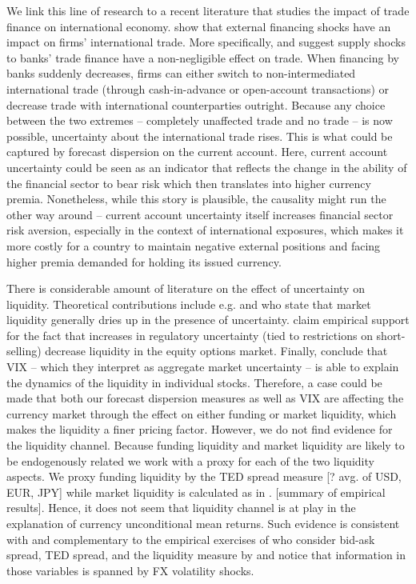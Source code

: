 We link this line of research to a recent literature that studies the impact of trade finance on international economy. \citet{chor_manova2012} show that external financing shocks have an impact on firms' international trade. More specifically, \citet{amiti_weinstein2011} and \citet{niepmann_schmidt2014b} suggest supply shocks to banks' trade finance have a non-negligible effect on trade. When financing by banks suddenly decreases, firms can either switch to non-intermediated international trade (through cash-in-advance or open-account transactions) or decrease trade with international counterparties outright. Because any choice between the two extremes -- completely unaffected trade and no trade -- is now possible, uncertainty about the international trade rises. This is what could be captured by forecast dispersion on the current account. Here, current account uncertainty could be seen as an indicator that reflects the change in the ability of the financial sector to bear risk which then translates into higher currency premia. Nonetheless, while this story is plausible, the causality might run the other way around -- current account uncertainty itself increases financial sector risk aversion, especially in the context of international exposures, which makes it more costly for a country to maintain negative external positions and facing higher premia demanded for holding its issued currency.

There is considerable amount of literature on the effect of uncertainty on liquidity. Theoretical contributions include e.g. \citet{routledge_zin2009} and \citet{easley_ohara2010} who state that market liquidity generally dries up in the presence of uncertainty. \citet{battalio_schultz2011} claim empirical support for the fact that increases in regulatory uncertainty (tied to restrictions on short-selling) decrease liquidity in the equity options market. Finally, \citet{chung_chuwonganant2014} conclude that VIX -- which they interpret as aggregate market uncertainty -- is able to explain the dynamics of the liquidity in individual stocks. Therefore, a case could be made that both our forecast dispersion measures as well as VIX are affecting the currency market through the effect on either funding or market liquidity, which makes the liquidity a finer pricing factor. However, we do not find evidence for the liquidity channel. Because funding liquidity and market liquidity are likely to be endogenously related \citep{brunnermeier_pedersen2009} we work with a proxy for each of the two liquidity aspects. We proxy funding liquidity by the TED spread measure [? avg. of USD, EUR, JPY] while market liquidity is calculated as in \citet{karnaukh_etal2015}. [summary of empirical results]. Hence, it does not seem that liquidity channel is at play in the explanation of currency unconditional mean returns. Such evidence is consistent with and complementary to the empirical exercises of \citet{menkhoff_etal2012} who consider bid-ask spread, TED spread, and the liquidity measure by \citet{pastor_stambaugh2003} and notice that information in those variables is spanned by FX volatility shocks.

